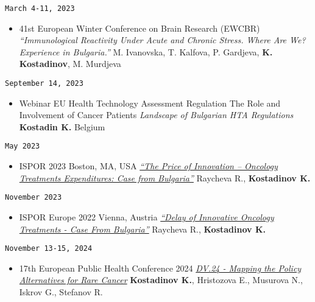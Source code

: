 \documentclass[
  12pt,
  letterpaper,
  DIV=11,
  numbers=noendperiod]{scrartcl}
\providecommand{\tightlist}{%
  \setlength{\itemsep}{0pt}\setlength{\parskip}{0pt}}\usepackage{longtable,booktabs,array}
\begin{document}
\texttt{March\ 4-11,\ 2023}

\begin{itemize}
\tightlist
\item
  41st European Winter Conference on Brain Research (EWCBR) \textbar{}
  \emph{``Immunological Reactivity Under Acute and Chronic Stress. Where
  Are We? Experience in Bulgaria.''} \textbar{} M. Ivanovska, T.
  Kalfova, P. Gardjeva, \textbf{K. Kostadinov}, M. Murdjeva
\end{itemize}

\texttt{September\ 14,\ 2023}

\begin{itemize}
\tightlist
\item
  Webinar \textbar{} EU Health Technology Assessment Regulation
  \textbar{} The Role and Involvement of Cancer Patients \textbar{}
  \emph{Landscape of Bulgarian HTA Regulations} \textbar{}
  \textbf{Kostadin K.} \textbar{} Belgium
\end{itemize}

\texttt{May\ 2023}

\begin{itemize}
\tightlist
\item
  ISPOR 2023 \textbar{} Boston, MA, USA \textbar{}
  \href{https://www.ispor.org/heor-resources/presentations-database/presentation/intl2023-3665/126756}{\emph{``The
  Price of Innovation -- Oncology Treatments Expenditures: Case from
  Bulgaria''}} \textbar{} Raycheva R., \textbf{Kostadinov K.}
\end{itemize}

\texttt{November\ 2023}

\begin{itemize}
\tightlist
\item
  ISPOR Europe 2022 \textbar{} Vienna, Austria \textbar{}
  \href{https://www.ispor.org/heor-resources/presentations-database/presentation/euro2022-3565/120960}{\emph{``Delay
  of Innovative Oncology Treatments - Case From Bulgaria''}} \textbar{}
  Raycheva R., \textbf{Kostadinov K.}
\end{itemize}

\texttt{November\ 13-15,\ 2024}

\begin{itemize}
\tightlist
\item
  17th European Public Health Conference 2024 \textbar{}
  \href{https://ephconference.eu/app/programme/programme.php?d=displays}{\emph{DV.24
  - Mapping the Policy Alternatives for Rare Cancer}} \textbar{}
  \textbf{Kostadinov K.}, Hristozova E., Musurova N., Iskrov G.,
  Stefanov R.
\end{itemize}
\end{document}

